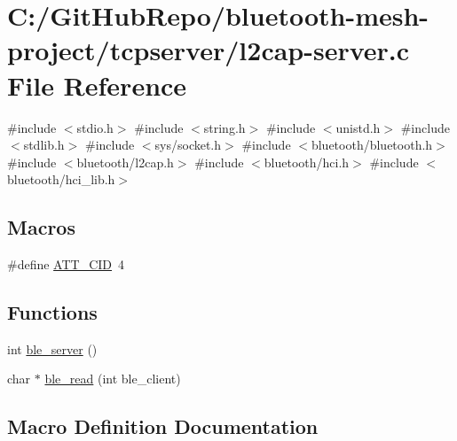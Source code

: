 \hypertarget{tcpserver_2l2cap-server_8c}{}\section{C\+:/\+Git\+Hub\+Repo/bluetooth-\/mesh-\/project/tcpserver/l2cap-\/server.c File Reference}
\label{tcpserver_2l2cap-server_8c}
{\ttfamily \#include $<$stdio.\+h$>$}\newline
{\ttfamily \#include $<$string.\+h$>$}\newline
{\ttfamily \#include $<$unistd.\+h$>$}\newline
{\ttfamily \#include $<$stdlib.\+h$>$}\newline
{\ttfamily \#include $<$sys/socket.\+h$>$}\newline
{\ttfamily \#include $<$bluetooth/bluetooth.\+h$>$}\newline
{\ttfamily \#include $<$bluetooth/l2cap.\+h$>$}\newline
{\ttfamily \#include $<$bluetooth/hci.\+h$>$}\newline
{\ttfamily \#include $<$bluetooth/hci\+\_\+lib.\+h$>$}\newline
\subsection*{Macros}
\begin{DoxyCompactItemize}
\item 
\#define \mbox{\hyperlink{tcpserver_2l2cap-server_8c_acd26973fe5a2cba0e34e0d81717c6bda}{A\+T\+T\+\_\+\+C\+ID}}~4
\end{DoxyCompactItemize}
\subsection*{Functions}
\begin{DoxyCompactItemize}
\item 
int \mbox{\hyperlink{tcpserver_2l2cap-server_8c_ad0f02beb64dd67c688103f2ebe24425c}{ble\+\_\+server}} ()
\item 
char $\ast$ \mbox{\hyperlink{tcpserver_2l2cap-server_8c_a0dd2eff36cd18422cd52bee8b067010d}{ble\+\_\+read}} (int ble\+\_\+client)
\end{DoxyCompactItemize}


\subsection{Macro Definition Documentation}
\mbox{\label{tcpserver_2l2cap-server_8c_acd26973fe5a2cba0e34e0d81717c6bda}} 
